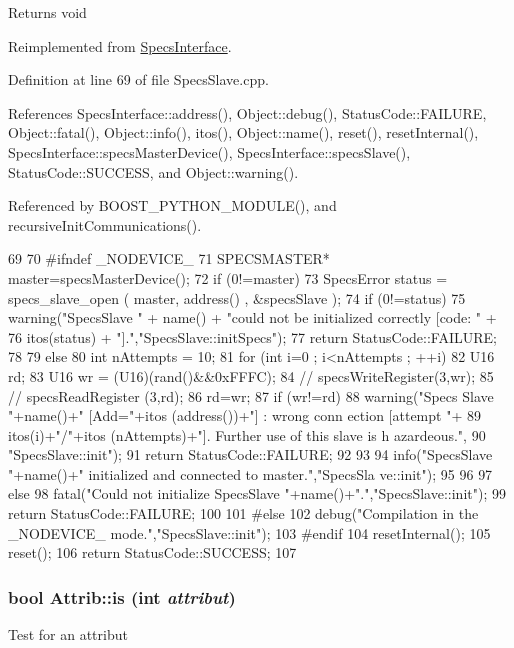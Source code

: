 \begin{DoxyReturn}{Returns}
void 
\end{DoxyReturn}


Reimplemented from \hyperlink{classSpecsInterface_a99ec05cbe0d15892afbec6feaf33c89b}{SpecsInterface}.

Definition at line 69 of file SpecsSlave.cpp.

References SpecsInterface::address(), Object::debug(), StatusCode::FAILURE, Object::fatal(), Object::info(), itos(), Object::name(), reset(), resetInternal(), SpecsInterface::specsMasterDevice(), SpecsInterface::specsSlave(), StatusCode::SUCCESS, and Object::warning().

Referenced by BOOST\_\-PYTHON\_\-MODULE(), and recursiveInitCommunications().


\begin{DoxyCode}
69                            {
70 #ifndef _NODEVICE_
71   SPECSMASTER* master=specsMasterDevice();
72   if (0!=master){
73     SpecsError status = specs_slave_open ( master, address() , &specsSlave );
74     if (0!=status){
75       warning("SpecsSlave " + name() + "could not be initialized correctly [code:
      " +
76               itos(status) + "].","SpecsSlave::initSpecs");
77       return StatusCode::FAILURE;
78     }
79     else{
80       int nAttempts = 10;
81       for (int i=0 ; i<nAttempts ; ++i){
82         U16 rd;
83         U16 wr = (U16)(rand()&&0xFFFC);
84         //  specsWriteRegister(3,wr);
85         //  specsReadRegister (3,rd);
86         rd=wr;
87         if (wr!=rd){
88           warning("Specs Slave "+name()+" [Add="+itos (address())+"] : wrong conn
      ection [attempt "+
89                   itos(i)+"/"+itos (nAttempts)+"]. Further use of this slave is h
      azardeous.",
90                   "SpecsSlave::init");
91           return StatusCode::FAILURE; 
92         }
93       }
94       info("SpecsSlave "+name()+" initialized and connected to master.","SpecsSla
      ve::init");
95     }
96   }
97   else{
98     fatal("Could not initialize SpecsSlave "+name()+".","SpecsSlave::init");
99     return StatusCode::FAILURE; 
100   }
101 #else
102   debug("Compilation in the _NODEVICE_ mode.","SpecsSlave::init");
103 #endif
104   resetInternal();
105   reset();
106   return StatusCode::SUCCESS;
107 }
\end{DoxyCode}
\hypertarget{classAttrib_a704f26af560909ad22065083bb7d4c34}{
\subsubsection[{is}]{\setlength{\rightskip}{0pt plus 5cm}bool Attrib::is (int {\em attribut})}}
\label{classAttrib_a704f26af560909ad22065083bb7d4c34}
Test for an attribut 

